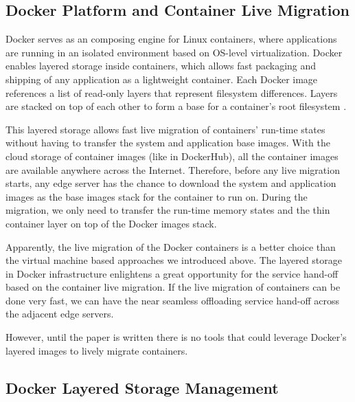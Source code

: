 
\subsection{Docker Platform and Container Live Migration}

Docker serves as an composing engine for Linux containers, where applications are running in an isolated environment based on OS-level virtualization. Docker enables layered storage inside containers, which allows fast packaging and shipping of any application as a lightweight container. Each Docker image references a list of read-only layers that represent filesystem differences. Layers are stacked on top of each other to form a base for a container’s root filesystem \cite{dockerlayer}. 

This layered storage allows fast live migration of containers' run-time states without having to transfer the system and application base images. With the cloud storage of container images (like in DockerHub), all the container images are available anywhere across the Internet. Therefore, before any live migration starts, any edge server has the chance to download the system and application images as the base images stack for the container to run on. 
During the migration, we only need to transfer the run-time memory states and the thin container layer on top of the Docker images stack. 

Apparently, the live migration of the Docker containers is a better choice than the virtual machine based approaches we introduced above. The layered storage in Docker infrastructure enlightens a great opportunity for the service hand-off based on the container live migration. If the live migration of containers can be done very fast, we can have the near seamless offloading service hand-off across the adjacent edge servers.

However, until the paper is written there is no tools that could leverage Docker's layered images to lively migrate containers. 



\subsection{Docker Layered Storage Management}\label{aufsIntroduction}


